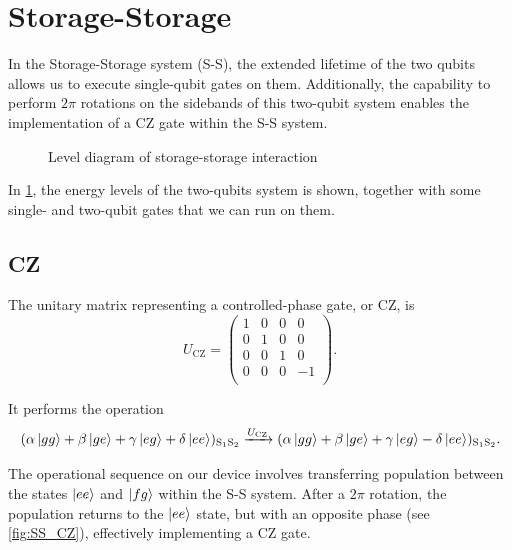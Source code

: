 
\section{Storage-Storage}
\label{sec:S-S}

In the Storage-Storage system (S-S), the extended lifetime of the two qubits allows us to execute single-qubit gates on them.
Additionally, the capability to perform $2\pi$ rotations on the sidebands of this two-qubit system enables the implementation of a CZ gate within the S-S system.

\begin{figure}[b]
    \centering
    
    \vspace{-1cm}
    \caption{Level diagram of storage-storage interaction}
    \label{fig:SS_level}
\end{figure}

In \cref{fig:SS_level}, the energy levels of the two-qubits system is shown, together with some single- and two-qubit gates that we can run on them.

\subsection{CZ}

The unitary matrix representing a controlled-phase gate, or CZ, is
\begin{equation}
    U_{\text{CZ}} = 
    \begin{pmatrix}
    1 & 0 & 0 & 0 \\
    0 & 1 & 0 & 0 \\
    0 & 0 & 1 & 0 \\
    0 & 0 & 0 & -1 \\
\end{pmatrix}.
\end{equation}

It performs the operation
\begin{equation}
    (\alpha \ket{gg} + \beta \ket{ge} + \gamma \ket{eg} + \delta \ket{ee})_{\text{S}_1 \text{S}_2} \xrightarrow{U_{\text{CZ}}}
    (\alpha \ket{gg} + \beta \ket{ge} + \gamma \ket{eg} - \delta \ket{ee})_{\text{S}_1 \text{S}_2} . 
\end{equation}

The operational sequence on our device involves transferring population between the states $\ket{ee}$ and $\ket{fg}$ within the S-S system.
After a $2\pi$ rotation, the population returns to the $\ket{ee}$ state, but with an opposite phase (see \cref{fig:SS_CZ}), effectively implementing a CZ gate.

